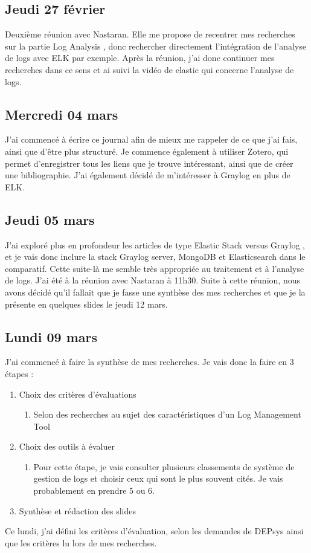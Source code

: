 \documentclass[paper=a4, fontsize=11pt]{scrartcl}
\begin{document}
\subsection{Jeudi 27 février}
    Deuxième réunion avec Nastaran. Elle me propose de recentrer mes recherches sur la partie \og Log Analysis \fg, donc rechercher directement l'intégration de l'analyse de logs avec ELK par exemple. Après la réunion, j'ai donc continuer mes recherches dans ce sens et ai suivi la vidéo de elastic qui concerne l'analyse de logs.
\subsection{Mercredi 04 mars}
    J'ai commencé à écrire ce journal afin de mieux me rappeler de ce que j'ai fais, ainsi que d'être plus structuré. Je commence également à utiliser Zotero, qui permet d'enregistrer tous les liens que je trouve intéressant, ainsi que de créer une bibliographie. J'ai également décidé de m'intéresser à Graylog en plus de ELK.
\subsection{Jeudi 05 mars}
    J'ai exploré plus en profondeur les articles de type \og Elastic Stack versus Graylog \fg, et je vais donc inclure la stack \og Graylog server, MongoDB et Elasticsearch \fg dans le comparatif. Cette suite-là me semble très appropriée au traitement et à l'analyse de logs.
    J'ai été à la réunion avec Nastaran à 11h30. Suite à cette réunion, nous avons décidé qu'il fallait que je fasse une synthèse des mes recherches et que je la présente en quelques slides le jeudi 12 mars.
\subsection{Lundi 09 mars}
    J'ai commencé à faire la synthèse de mes recherches. Je vais donc la faire en 3 étapes :
    \begin{enumerate}
    \item Choix des critères d'évaluations
        \begin{enumerate}
            \item Selon des recherches au sujet des caractéristiques d'un \og Log Management Tool \fg
        \end{enumerate}
    \item Choix des outils à évaluer
        \begin{enumerate}
                \item Pour cette étape, je vais consulter plusieurs classements de système de gestion de logs et choisir ceux qui sont le plus souvent cités. Je vais probablement en prendre 5 ou 6.
        \end{enumerate}
    \item Synthèse et rédaction des slides
    \end{enumerate}
    Ce lundi, j'ai défini les critères d'évaluation, selon les demandes de DEPsys ainsi que les critères lu lors de mes recherches.
\end{document}

